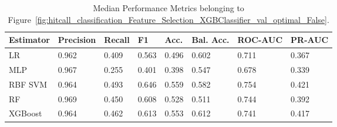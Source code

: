 \begin{longtable}{llllllll}
\caption{Median Performance Metrics belonging to Figure~\ref{fig:hitcall_classification_Feature_Selection_XGBClassifier_val_optimal_False}.}\label{tab:table:hitcall_classification_feature_selection_xgbclassifier_val_optimal_false}\\
\toprule
\midrule
\small Estimator & \small Precision & \small Recall & \small F1 & \small Acc. & \small Bal. Acc. & \small ROC-AUC & \small PR-AUC\\
\hline
LR & 0.962 & 0.409 & 0.563 & 0.496 & 0.602 & 0.711 & 0.367\\
MLP & 0.967 & 0.255 & 0.401 & 0.398 & 0.547 & 0.678 & 0.339\\
RBF SVM & 0.964 & 0.493 & 0.646 & 0.559 & 0.582 & 0.754 & 0.421\\
RF & 0.969 & 0.450 & 0.608 & 0.528 & 0.511 & 0.744 & 0.392\\
XGBoost & 0.964 & 0.462 & 0.613 & 0.553 & 0.612 & 0.741 & 0.417\\
\bottomrule
\end{longtable}